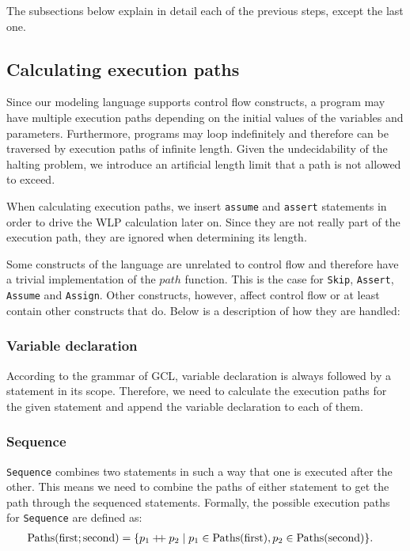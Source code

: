 \documentclass[a4paper]{article}
\newcommand\mdoubleplus{\ensuremath{\mathbin{+\mkern-5mu+}}}
\begin{document}
The subsections below explain in detail each of the previous steps, except the last
one.

\subsection{Calculating execution paths}

Since our modeling language supports control flow constructs, a program may have
multiple execution paths depending on the initial values of the variables and
parameters. Furthermore, programs may loop indefinitely and therefore can be
traversed by execution paths of infinite length. Given the undecidability of the
halting problem, we introduce an artificial length limit that a path is not
allowed to exceed.

When calculating execution paths, we insert \texttt{assume} and \texttt{assert}
statements in order to drive the WLP calculation later on. Since they are not
really part of the execution path, they are ignored when determining its length.

Some constructs of the language are unrelated to control flow and therefore have
a trivial implementation of the $path$ function. This is the case for
\texttt{Skip}, \texttt{Assert}, \texttt{Assume} and \texttt{Assign}. Other
constructs, however, affect control flow or at least contain other constructs
that do. Below is a description of how they are handled:

\subsubsection*{Variable declaration}

According to the grammar of GCL, variable declaration is always followed by a
statement in its scope. Therefore, we need to calculate the execution paths for
the given statement and append the variable declaration to each of them.

\subsubsection*{Sequence}

\texttt{Sequence} combines two statements in such a way that one is executed
after the other. This means we need to combine the paths of either statement
to get the path through the sequenced statements. Formally, the possible
execution paths for \texttt{Sequence} are defined as:
\begin{align*}
	\text{Paths}(\text{first} ; \text{second}) &= \{ p_1 \mdoubleplus p_2 \mid p_1 \in \text{Paths}(\text{first}), p_2 \in \text{Paths}(\text{second})\}.
\end{align*}
\end{document}
